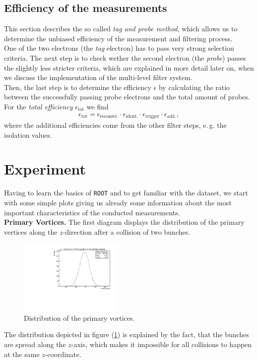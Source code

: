 \documentclass[twocolumn,
			   showpacs,%
               nofootinbib,
               aps,%
               prd,
               notitlepage,
               showkeys,
               10pt]{revtex4-1}
\begin{document}
\subsection{Efficiency of the measurements}
This section describes the so called \textit{tag and probe method}, which allows us to determine the unbiased efficiency of the measurement and filtering process.\\
One of the two electrons (the \textit{tag} electron) has to pass very strong selection criteria. The next step is to check wether the second electron (the \textit{probe}) passes the slightly less stricter criteria, which are explained in more detail later on, when we discuss the implementation of the multi-level filter system. \\
Then, the last step is to determine the efficiency $\epsilon$ by calculating the ratio between the successfully passing probe electrons and the total amount of probes.\\
For the \textit{total efficiency} $\epsilon_{\text{tot}}$ we find 
\begin{align}
	\epsilon_{\text{tot}} = \epsilon_{\text{reconstr.}} \cdot \epsilon_{\text{ident.}} \cdot \epsilon_{\text{trigger}} \cdot \epsilon_{\text{add.}},
\end{align}
 where the additional efficiencies come from the other filter steps, e.\,g. the isolation values. 


\section{Experiment}

Having to learn the basics of \verb|ROOT| and to get familiar with the dataset, we start with some simple plots giving us already some information about the most important characteristics of the conducted measurements.\\

\textbf{Primary Vortices.} The first diagram displays the distribution of the primary vertices along the $z$-direction after a collision of two bunches.
\begin{figure}[H]
\centering
\includegraphics[width = 0.45\textwidth]{figures/plots/DistPrimVort}
\caption{Distribution of the primary vortices.}
\label{fig:vortices}
\end{figure}
The distribution depicted in figure (\ref{fig:vortices}) is explained by the fact, that the bunches are spread along the $z$-axis, which makes it impossible for all collisions to happen at the same $z$-coordinate.\\
\end{document}
